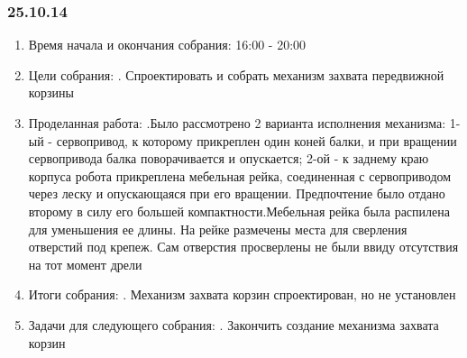 \documentclass[11pt]{article}
\begin{document}
           \subsubsection{25.10.14}
           \begin{enumerate}
              \item Время начала и окончания собрания:
              16:00 - 20:00
              \newline
              \item Цели собрания:
              . Спроектировать и собрать механизм захвата передвижной корзины
              \item Проделанная работа:
              .Было рассмотрено 2 варианта исполнения механизма: 1-ый - сервопривод, к которому прикреплен один коней балки, и при вращении сервопривода балка поворачивается и опускается; 2-ой - к заднему краю корпуса робота прикреплена мебельная рейка, соединенная с сервоприводом через леску и опускающаяся при его вращении. Предпочтение было отдано второму в силу его большей компактности.Мебельная рейка была распилена для уменьшения ее длины. На рейке размечены места для сверления отверстий под крепеж. Сам отверстия просверлены не были ввиду отсутствия на тот момент дрели 
              \item Итоги собрания:
              . Механизм захвата корзин спроектирован, но не установлен
              \item Задачи для следующего собрания:
              . Закончить создание механизма захвата корзин
           \end{enumerate}
           \newpage
\end{document}
